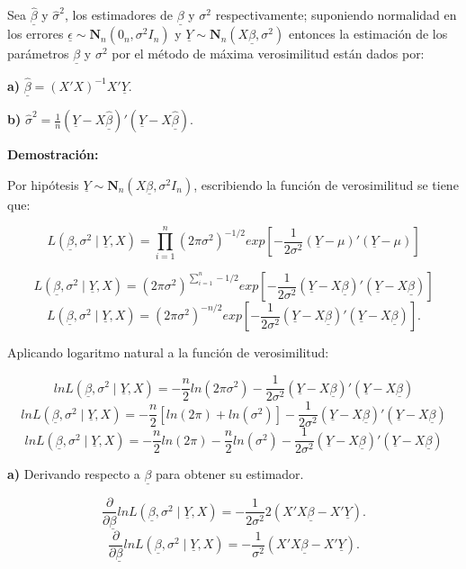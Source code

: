 \documentclass[
  a4paper,
  oneside,
  openany]{book}
\begin{document}
Sea \(\underline{\hat{\beta}}\) y \(\hat{\sigma}^2\), los estimadores de \(\underline{\beta}\) y \(\sigma^2\) respectivamente; suponiendo normalidad en los errores \(\underline{\epsilon} \sim \mathbf{N}_{n}(0_{n},\sigma^2 I_{n})\) y \(\underline{Y}\sim \mathbf{N}_{n}(X \underline{\beta},\sigma^2)\) entonces la estimación de los parámetros \(\underline{\beta}\) y \(\sigma^2\) por el método de máxima verosimilitud están dados por:

\textbf{a)} \(\underline{\hat{\beta}}=(X'X)^{-1}X'\underline{Y}\).

\textbf{b)} \(\hat{\sigma}^2=\frac{1}{n}\left( \underline{Y}-X\underline{\hat{\beta}}\right)'\left(\underline{Y}-X \underline{\hat{\beta}}\right).\)

\textbf{Demostración:}

Por hipótesis \(\underline{Y}\sim \mathbf{N}_{n}(X\underline{\beta},\sigma^2 I_{n})\), escribiendo la función de verosimilitud se tiene que:

\[L(\underline{\beta},\sigma^2 \mid \underline{Y},X)=\prod_{i=1}^{n}(2\pi\sigma^2)^{-1/2} exp \left[ - \frac{1}{2\sigma^2}(\underline{Y}-\mu)'(\underline{Y}-\mu) \right]\]

\[L(\underline{\beta},\sigma^2 \mid \underline{Y},X)=(2\pi\sigma^2)^{\sum_{i=1}^{n}-1/2} exp \left[ - \frac{1}{2\sigma^2}(\underline{Y}-X\underline{\beta})'(\underline{Y}-X\underline{\beta}) \right]\]
\[L(\underline{\beta},\sigma^2 \mid \underline{Y},X)=(2\pi\sigma^2)^{-n/2} exp \left[ - \frac{1}{2\sigma^2}(\underline{Y}-X\underline{\beta})'(\underline{Y}-X\underline{\beta}) \right].\]

Aplicando logaritmo natural a la función de verosimilitud:

\[lnL(\underline{\beta},\sigma^2 \mid \underline{Y},X)= -\frac{n}{2}ln(2\pi\sigma^2)-\frac{1}{2\sigma^2}(\underline{Y}-X\underline{\beta})'(\underline{Y}-X\underline{\beta})\]
\[lnL(\underline{\beta},\sigma^2 \mid \underline{Y},X)= -\frac{n}{2}[ln(2\pi)+ln(\sigma^2)]-\frac{1}{2\sigma^2}(\underline{Y}-X\underline{\beta})'(\underline{Y}-X\underline{\beta})\]
\[lnL(\underline{\beta},\sigma^2 \mid \underline{Y},X)= -\frac{n}{2}ln(2\pi)-\frac{n}{2}ln(\sigma^2)-\frac{1}{2\sigma^2}(\underline{Y}-X\underline{\beta})'(\underline{Y}-X\underline{\beta})\]

\textbf{a)} Derivando respecto a \(\underline{\beta}\) para obtener su estimador.

\[\frac{\partial}{\partial \underline{\beta}}lnL(\underline{\beta},\sigma^2 \mid \underline{Y},X)=-\frac{1}{2\sigma^2}2(X'X\underline{\beta}-X'\underline{Y}).\]
\[\frac{\partial}{\partial \underline{\beta}}lnL(\underline{\beta},\sigma^2 \mid \underline{Y},X)=-\frac{1}{\sigma^2}(X'X\underline{\beta}-X'\underline{Y}).\]
\end{document}
